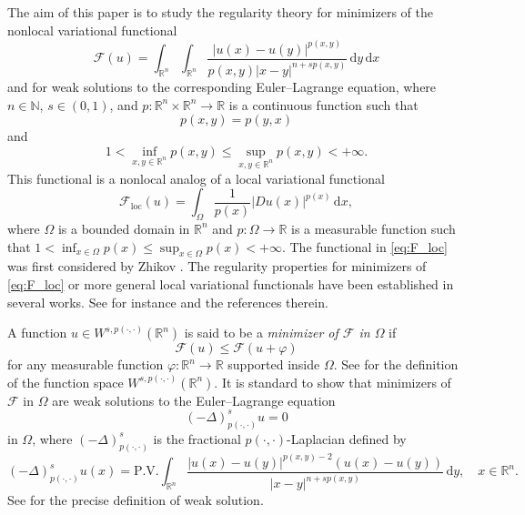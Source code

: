 \documentclass[11pt]{amsart}
\theoremstyle{plain}
\theoremstyle{definition}
\numberwithin{equation}{section}
\begin{document}
The aim of this paper is to study the regularity theory for minimizers of the nonlocal variational functional
\begin{equation} \label{eq:F}
\mathcal{F}(u) = \int_{\mathbb{R}^n}\int_{\mathbb{R}^n} \frac{|u(x)-u(y)|^{p(x,y)}}{p(x,y) |x-y|^{n+sp(x,y)}} \,\mathrm{d}y\,\mathrm{d}x
\end{equation}
and for weak solutions to the corresponding Euler--Lagrange equation, where $n \in \mathbb{N}$, $s \in (0,1)$, and $p:\mathbb{R}^n \times \mathbb{R}^n \to \mathbb{R}$ is a continuous function such that
\begin{equation} \label{eq:symmetry}
p(x,y) = p(y,x)
\end{equation}
and
\begin{equation} \label{eq:bounds}
1 < \inf_{x, y \in \mathbb{R}^n} p(x,y) \leq \sup_{x, y \in \mathbb{R}^n} p(x,y) < +\infty.
\end{equation}
This functional is a nonlocal analog of a local variational functional
\begin{equation} \label{eq:F_loc}
\mathcal{F}_{\mathrm{loc}}(u) = \int_{\Omega} \frac{1}{p(x)} |Du(x)|^{p(x)} \,\mathrm{d}x,
\end{equation}
where $\Omega$ is a bounded domain in $\mathbb{R}^n$ and $p: \Omega \to \mathbb{R}$ is a measurable function such that $1 < \inf_{x \in \Omega} p(x) \leq \sup_{x \in \Omega} p(x) < +\infty$. The functional in \eqref{eq:F_loc} was first considered by Zhikov \cite{Zhi86,Zhi93}. The regularity properties for minimizers of \eqref{eq:F_loc} or more general local variational functionals have been established in several works. See for instance \cite{Mar89,Mar91,AF94,Zhi95,Alk97,CPC97,Zhi97,CM99,FZ99,AM01,HKLMP08,HHLN10,Bre12,Ok18,DZZ20} and the references therein.

A function $u \in W^{s,p(\cdot,\cdot)}(\mathbb{R}^n)$ is said to be a {\it minimizer of $\mathcal{F}$ in $\Omega$} if
\begin{equation*}
\mathcal{F}(u) \leq \mathcal{F}(u+\varphi)
\end{equation*}
for any measurable function $\varphi:\mathbb{R}^n \to \mathbb{R}$ supported inside $\Omega$. See  for the definition of the function space $W^{s,p(\cdot,\cdot)}(\mathbb{R}^n)$. It is standard to show that minimizers of $\mathcal{F}$ in $\Omega$ are weak solutions to the Euler--Lagrange equation
\begin{equation} \label{eq:EL}
(-\Delta)^s_{p(\cdot,\cdot)}u = 0
\end{equation}
in $\Omega$, where $(-\Delta)_{p(\cdot,\cdot)}^{s}$ is the fractional $p(\cdot,\cdot)$-Laplacian defined by
\begin{equation*}
(-\Delta)_{p(\cdot,\cdot)}^{s}u(x) = \mathrm{P.V.} \int_{\mathbb{R}^n} \frac{|u(x)-u(y)|^{p(x,y)-2}(u(x)-u(y))}{|x-y|^{n+sp(x,y)}} \,\mathrm{d}y, \quad x \in \mathbb{R}^n.
\end{equation*}
See  for the precise definition of weak solution.
\end{document}
